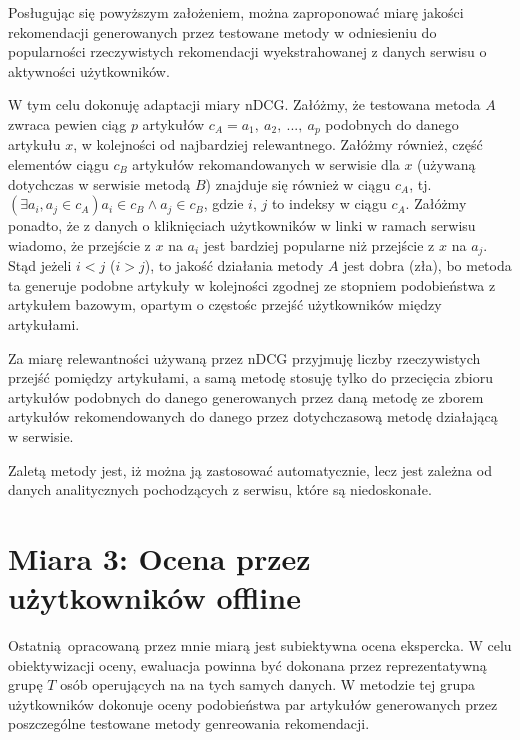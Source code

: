 \documentclass[pl]{minipw} %
\begin{document}
Posługując się powyższym założeniem, można zaproponować miarę jakości rekomendacji generowanych przez testowane metody w odniesieniu do popularności rzeczywistych rekomendacji wyekstrahowanej z danych serwisu o aktywności użytkowników.

W tym celu dokonuję adaptacji miary nDCG. Załóżmy, że testowana metoda $A$ zwraca pewien ciąg $p$ artykułów $c_A=a_1,\ a_2,\ ...,\ a_p$ podobnych do danego artykułu $x$, w kolejności od najbardziej relewantnego. Załóżmy również, część elementów ciągu $c_B$ artykułów rekomandowanych w serwisie dla $x$ (używaną dotychczas w serwisie metodą $B$) znajduje się również w ciągu $c_A$, tj. $(\exists{a_i, a_j\in c_A})a_i \in c_B \land a_j \in c_B$, gdzie $i$, $j$ to indeksy w ciągu $c_A$. Załóżmy ponadto, że z danych o kliknięciach użytkowników w linki w ramach serwisu wiadomo, że przejście z $x$ na $a_i$ jest bardziej popularne niż przejście z $x$ na $a_j$. Stąd jeżeli $i<j$ ($i>j$), to jakość działania metody $A$ jest dobra (zła), bo metoda ta generuje podobne artykuły w kolejności zgodnej ze stopniem podobieństwa z artykułem bazowym, opartym o częstośc przejść użytkowników między artykułami.

Za miarę relewantności używaną przez nDCG przyjmuję liczby rzeczywistych przejść pomiędzy artykułami, a samą metodę stosuję tylko do przecięcia zbioru artykułów podobnych do danego generowanych przez daną metodę ze zborem artykułów rekomendowanych do danego przez dotychczasową metodę działającą w serwisie.

Zaletą metody jest, iż można ją zastosować automatycznie, lecz jest zależna od danych analitycznych pochodzących z serwisu, które są niedoskonałe.

\section{Miara 3: Ocena przez użytkowników offline}

Ostatnią opracowaną przez mnie miarą jest subiektywna ocena ekspercka. W celu obiektywizacji oceny, ewaluacja powinna być dokonana przez reprezentatywną grupę $T$ osób operujących na na tych samych danych. W metodzie tej grupa użytkowników dokonuje oceny podobieństwa par artykułów generowanych przez poszczególne testowane metody genreowania rekomendacji.
\end{document}
